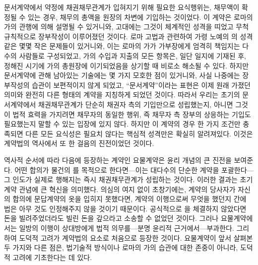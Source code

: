 문서계약에서 약정에 채권채무관계가 입혀지기 위해 필요한
요식행위는,
채무액이 확정될 수 있는 경우,
채무의 총액을
원장의 차변에 기입하는 것이었다.
이 계약은 로마의 가의 관행에 의해 설명될 수 있거니와,
고대에는 그것이 체계적인 성격을 띠었고 무척 규칙적으로 장부작성이
이루어졌던 것이다.
로마 고법과 관련하여
가령 노예의 의 성격 같은
몇몇 작은 문제들이 있거니와,
이는
로마의 가가 가부장에게 엄격히 책임지는 다수의 사람들로
구성되었고,
가의 수입과 지출의 모든 항목은,
일단 일지에 기재된 후,
정해진 시기에
가의 총원장에 이기되었음을 상기할 때
비로소 해소될 수 있다.
하지만 문서계약에 관해 남아있는 기술에는
몇 가지 모호한 점이 있거니와,
사실
나중에는
장부작성의 습관이
보편적이지 않게 되었고,
``문서계약''이라는 표현은 이제 원래 가졌던 의미와 완전히
다른 형태의 계약을 지칭하게 되었던 것이다.
따라서 우리는
초기의 문서계약에서
채권채무관계가 단순히 채권자 측의 기입만으로 성립했는지,
아니면
그것이 법적 효력을 가지려면
채무자의 동일한 행위, 즉 채무자 측 장부의 상응하는 기입도 필요했는지
말할 수 있는 입장에 있지 않다.
하지만
이 계약의 경우
한 가지 조건만 충족되면 다른 모든 요식성은 필요치 않다는
핵심적 성격만은 확실히 알려져있다.
이것은 계약법의 역사에서 또 한 걸음의 진전이었던 것이다.

역사적 순서에 따라 다음에 등장하는 계약인 요물계약은
윤리 개념의 큰 진전을 보여준다.
어떤 합의가 물건의 를 목적으로 한다면---이는
대다수의 단순한 계약을 포괄한다---그 인도가 실제로 행해지는 즉시
채권채무관계가 성립하는 것이다.
이러한 결과는 초기 계약 관념에 큰 혁신을 의미했다.
의심의 여지 없이 초창기에는,
계약의 당사자가 자신의 합의에 문답계약의 옷을 입히지 못했다면,
계약의 이행으로써 무엇을 했던지 간에
법은 아무 것도 인정해주지 않을 것이기 때문이다.
공식적으로 을 체결하지 않았다면
돈을 빌려주었더라도 빌린 돈을 갚으라고 소송할 수 없었던 것이다.
그러나 요물계약에서는
일방의 이행이 상대방에게 법적 의무를---분명 윤리적 근거에서---부과한다.
그리하여 도덕적 고려가 계약법의 요소로 처음으로 등장한 것이다.
요물계약이
앞서 살펴본 두 가지와 다른 점은,
법기술적 방식이나 로마의 가의 습관에 대한 존중이 아니라,
도덕적 고려에 기초한다는 데 있다.


